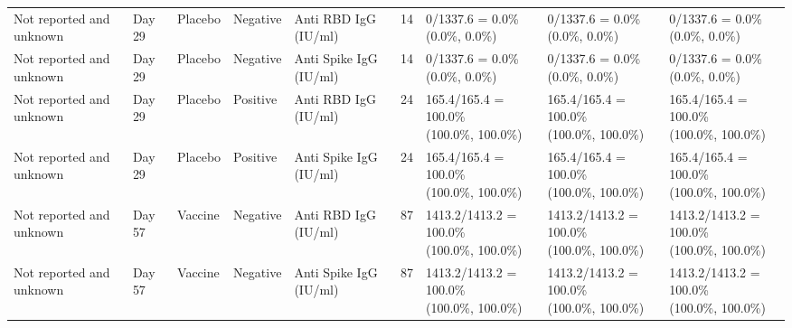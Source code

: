 \documentclass[]{book}
\theoremstyle{definition}
\theoremstyle{definition}
\theoremstyle{definition}
\newcommand{\1}{\mathbbm{1}}
\begin{document}
\begin{landscape}
\begin{ThreePartTable}
\begin{longtable}[t]{>{\raggedright\arraybackslash}p{2.7cm}llllllll}
\hspace{1em}Not reported and unknown & Day 29 & Placebo & Negative & Anti RBD IgG (IU/ml) & 14 & \makecell[l]{0/1337.6 = 0.0\%\\(0.0\%, 0.0\%)} & \makecell[l]{0/1337.6 = 0.0\%\\(0.0\%, 0.0\%)} & \makecell[l]{0/1337.6 = 0.0\%\\(0.0\%, 0.0\%)}\\
\hspace{1em}Not reported and unknown & Day 29 & Placebo & Negative & Anti Spike IgG (IU/ml) & 14 & \makecell[l]{0/1337.6 = 0.0\%\\(0.0\%, 0.0\%)} & \makecell[l]{0/1337.6 = 0.0\%\\(0.0\%, 0.0\%)} & \makecell[l]{0/1337.6 = 0.0\%\\(0.0\%, 0.0\%)}\\
\hspace{1em}Not reported and unknown & Day 29 & Placebo & Positive & Anti RBD IgG (IU/ml) & 24 & \makecell[l]{165.4/165.4 = 100.0\%\\(100.0\%, 100.0\%)} & \makecell[l]{165.4/165.4 = 100.0\%\\(100.0\%, 100.0\%)} & \makecell[l]{165.4/165.4 = 100.0\%\\(100.0\%, 100.0\%)}\\
\hspace{1em}Not reported and unknown & Day 29 & Placebo & Positive & Anti Spike IgG (IU/ml) & 24 & \makecell[l]{165.4/165.4 = 100.0\%\\(100.0\%, 100.0\%)} & \makecell[l]{165.4/165.4 = 100.0\%\\(100.0\%, 100.0\%)} & \makecell[l]{165.4/165.4 = 100.0\%\\(100.0\%, 100.0\%)}\\
\hspace{1em}Not reported and unknown & Day 57 & Vaccine & Negative & Anti RBD IgG (IU/ml) & 87 & \makecell[l]{1413.2/1413.2 = 100.0\%\\(100.0\%, 100.0\%)} & \makecell[l]{1413.2/1413.2 = 100.0\%\\(100.0\%, 100.0\%)} & \makecell[l]{1413.2/1413.2 = 100.0\%\\(100.0\%, 100.0\%)}\\
\hspace{1em}Not reported and unknown & Day 57 & Vaccine & Negative & Anti Spike IgG (IU/ml) & 87 & \makecell[l]{1413.2/1413.2 = 100.0\%\\(100.0\%, 100.0\%)} & \makecell[l]{1413.2/1413.2 = 100.0\%\\(100.0\%, 100.0\%)} & \makecell[l]{1413.2/1413.2 = 100.0\%\\(100.0\%, 100.0\%)}\\

\end{longtable}
\end{ThreePartTable}
\end{landscape}
\end{document}
